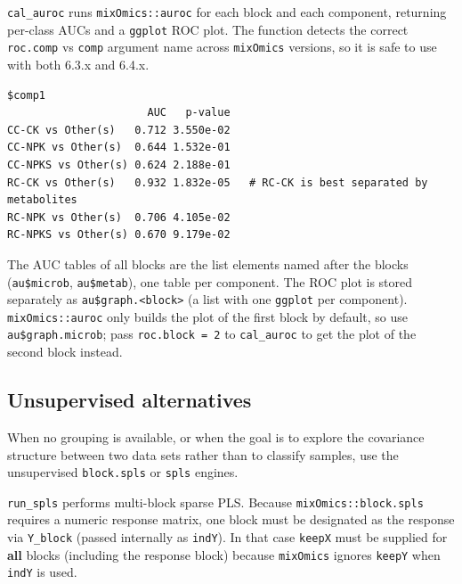 \documentclass[
]{book}
\newenvironment{Shaded}{\begin{snugshade}}{\end{snugshade}}
\newcommand{\AttributeTok}[1]{\textcolor[rgb]{0.13,0.29,0.53}{#1}}
\newcommand{\CommentTok}[1]{\textcolor[rgb]{0.56,0.35,0.01}{\textit{#1}}}
\newcommand{\DecValTok}[1]{\textcolor[rgb]{0.00,0.00,0.81}{#1}}
\newcommand{\FunctionTok}[1]{\textcolor[rgb]{0.13,0.29,0.53}{\textbf{#1}}}
\newcommand{\NormalTok}[1]{#1}
\newcommand{\OtherTok}[1]{\textcolor[rgb]{0.56,0.35,0.01}{#1}}
\newcommand{\SpecialCharTok}[1]{\textcolor[rgb]{0.81,0.36,0.00}{\textbf{#1}}}
\begin{document}
\texttt{cal\_auroc} runs \texttt{mixOmics::auroc} for each block and each component, returning per-class AUCs and a \texttt{ggplot} ROC plot.
The function detects the correct \texttt{roc.comp} vs \texttt{comp} argument name across \texttt{mixOmics} versions, so it is safe to use with both 6.3.x and 6.4.x.

\begin{Shaded}
\end{Shaded}

\begin{verbatim}
$comp1
                      AUC   p-value
CC-CK vs Other(s)   0.712 3.550e-02
CC-NPK vs Other(s)  0.644 1.532e-01
CC-NPKS vs Other(s) 0.624 2.188e-01
RC-CK vs Other(s)   0.932 1.832e-05   # RC-CK is best separated by metabolites
RC-NPK vs Other(s)  0.706 4.105e-02
RC-NPKS vs Other(s) 0.670 9.179e-02
\end{verbatim}

The AUC tables of all blocks are the list elements named after the blocks (\texttt{au\$microb}, \texttt{au\$metab}), one table per component.
The ROC plot is stored separately as \texttt{au\$graph.\textless{}block\textgreater{}} (a list with one \texttt{ggplot} per component).
\texttt{mixOmics::auroc} only builds the plot of the first block by default, so use \texttt{au\$graph.microb}; pass \texttt{roc.block\ =\ 2} to \texttt{cal\_auroc} to get the plot of the second block instead.

\subsection{Unsupervised alternatives}\label{unsupervised-alternatives}

When no grouping is available, or when the goal is to explore the covariance structure between two data sets rather than to classify samples, use the unsupervised \texttt{block.spls} or \texttt{spls} engines.

\texttt{run\_spls} performs multi-block sparse PLS.
Because \texttt{mixOmics::block.spls} requires a numeric response matrix, one block must be designated as the response via \texttt{Y\_block} (passed internally as \texttt{indY}).
In that case \texttt{keepX} must be supplied for \textbf{all} blocks (including the response block) because \texttt{mixOmics} ignores \texttt{keepY} when \texttt{indY} is used.
\end{document}
